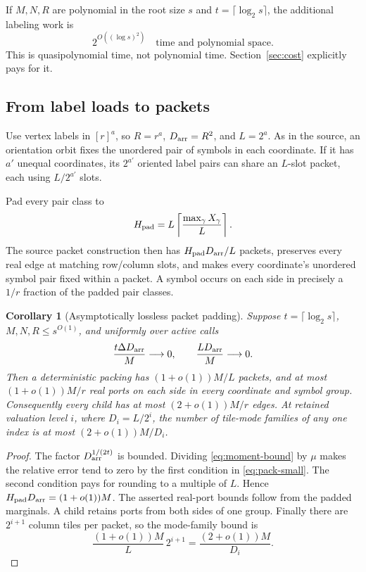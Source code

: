 \documentclass[11pt]{article}
\newtheorem{corollary}[theorem]{Corollary}
\theoremstyle{remark}\newtheorem{remark}[theorem]{Remark}
\newcommand{\Darr}{D_{\rm arr}}
\newcommand{\lp}{\log_2}
\begin{document}
If $M,N,R$ are polynomial in the root size $s$ and $t=\lceil\lp s\rceil$, the additional labeling work is
\begin{equation}
 2^{O((\log s)^2)}
 \quad\text{time and polynomial space.}
 \label{eq:packing-cost}
\end{equation}
This is quasipolynomial time, not polynomial time. Section~\ref{sec:cost} explicitly pays for it.

\subsection{From label loads to packets}
Use vertex labels in $[r]^a$, so $R=r^a$, $\Darr=R^2$, and $L=2^a$. As in the source, an orientation orbit fixes the unordered pair of symbols in each coordinate. If it has $a'$ unequal coordinates, its $2^{a'}$ oriented label pairs can share an $L$-slot packet, each using $L/2^{a'}$ slots.

Pad every pair class to
\[
 H_{\rm pad}=L\left\lceil\frac{\max_\gamma X_\gamma}{L}\right\rceil.
\]
The source packet construction then has $H_{\rm pad}\Darr/L$ packets, preserves every real edge at matching row/column slots, and makes every coordinate's unordered symbol pair fixed within a packet. A symbol occurs on each side in precisely a $1/r$ fraction of the padded pair classes.

\begin{corollary}[Asymptotically lossless packet padding]
\label{cor:padding}
Suppose $t=\lceil\lp s\rceil$, $M,N,R\le s^{O(1)}$, and uniformly over active calls
\begin{equation}
 \frac{t\Delta\Darr}{M}\longrightarrow0,
 \qquad \frac{L\Darr}{M}\longrightarrow0.
 \label{eq:pack-small}
\end{equation}
Then a deterministic packing has $(1+o(1))M/L$ packets, and at most $(1+o(1))M/r$ real ports on each side in every coordinate and symbol group. Consequently every child has at most $(2+o(1))M/r$ edges. At retained valuation level $i$, where $D_i=L/2^i$, the number of tile-mode families of any one index is at most $(2+o(1))M/D_i$.
\end{corollary}

\begin{proof}
The factor $\Darr^{1/(2t)}$ is bounded. Dividing \eqref{eq:moment-bound} by $\mu$ makes the relative error tend to zero by the first condition in \eqref{eq:pack-small}. The second condition pays for rounding to a multiple of $L$. Hence $H_{\rm pad}\Darr=(1+o(1))M$. The asserted real-port bounds follow from the padded marginals. A child retains ports from both sides of one group. Finally there are $2^{i+1}$ column tiles per packet, so the mode-family bound is
\[
 \frac{(1+o(1))M}{L}\,2^{i+1}
 =\frac{(2+o(1))M}{D_i}.
\]
\end{proof}
\end{document}
